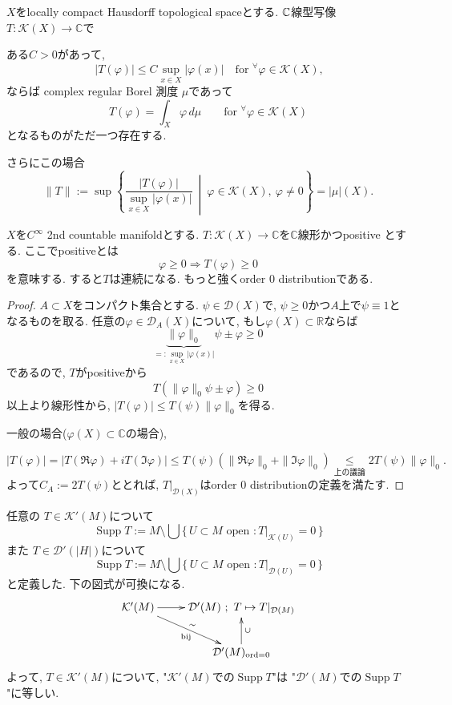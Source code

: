 \begin{tcolorbox}[mybox]
\begin{thm}\cite[Theorem 6.19]{Rud2}
\label{thm-M-4.2.13}
$X$をlocally compact Hausdorff topological spaceとする. 
$\mathbb{C}$線型写像$T:\mathcal{K}(X)\to \mathbb{C}$で

ある$ C>0$があって, 
$$\ |T(\varphi)|\leq C \sup_{x\in X}|\varphi(x)| \quad \text{for } {}^\forall \varphi\in \mathcal{K}(X),
$$
ならば
complex regular Borel 測度 $\mu$であって
\[
T(\varphi)=\int_X \varphi \, d\mu \qquad \text{for } {}^\forall \varphi\in \mathcal{K}(X)
\]
となるものがただ一つ存在する. 

さらにこの場合
\[
\|T\|:=\sup\left\{\frac{|T(\varphi)|}{\sup_{x\in X}|\varphi(x)|}\ \middle|\ \varphi\in \mathcal{K}(X),\ \varphi\neq 0\right\}
=|\mu|(X).
\]

\end{thm}
\end{tcolorbox}

\begin{rem}
$X$を$C^{\infty}$ 2nd countable manifoldとする. 
$T:\mathcal{K}(X)\to \mathbb{C}$を$\mathbb{C}$線形かつpositive とする.
ここでpositiveとは
\[
\varphi\geq 0 \Rightarrow T(\varphi)\geq 0
\]
を意味する. すると$T$は連続になる. もっと強くorder $0$ distributionである. 
\begin{proof}
$A\subset X$をコンパクト集合とする. 
 $\psi\in \mathcal{D}(X)$で, $\psi\geq 0$かつ$A$上で$\psi \equiv 1$となるものを取る. 
任意の$\varphi\in \mathcal{D}_A(X)$について, 
もし$\varphi(X)\subset \mathbb{R}$ならば
\[
\underbrace{\|\varphi\|_0}_{=:\sup_{x\in X} |\varphi(x)|}\psi \pm \varphi \geq 0
\]
であるので, $T$がpositiveから
\[
T(\|\varphi\|_0\psi \pm \varphi)\geq 0
\]
以上より線形性から, 
\( |T(\varphi)|\leq T(\psi)\|\varphi\|_0
\)を得る.

一般の場合($\varphi(X)\subset \mathbb{C}$の場合), 

\[
|T(\varphi)|=\left|T(\Re\varphi)+iT(\Im\varphi)\right|
\leq T(\psi)(\|\Re\varphi\|_0+\|\Im\varphi\|_0)
\underset{\text{上の議論}}{\leq} 2T(\psi)\|\varphi\|_0.
\]
よって$C_A:=2T(\psi)$ととれば, $T|_{\mathcal{D}(X)}$はorder $0$ distributionの定義を満たす. 
\end{proof}
\end{rem}



任意の \(T \in \mathcal{K}'(M)\)について
\[
\operatorname{Supp} T := M \setminus \bigcup \{\, U \subset M \text{ open }  : T|_{\mathcal{K}(U)} = 0 \,\}\]
また \(T \in \mathcal{D}'(|H|)\)について
\[\operatorname{Supp} T := M \setminus \bigcup \{\, U \subset M \text{ open } : T|_{\mathcal{D}(U)} = 0 \,\}\]
と定義した. 下の図式が可換になる.
\[
\xymatrix{
\mathcal{K}'(M) \ar[r] & \mathcal{D}'(M)\ ;\ T \mapsto T|_{\mathcal{D}(M)} \\
& \mathcal{D}'(M)_{\mathrm{ord}=0} \ar[u]_{\cup} \ar@{<-}[ul]_-{\sim}^{\mathrm{bij}}
}
\]
よって, 
\(T \in \mathcal{K}'(M)\)について, "$\mathcal{K}'(M)$での$\operatorname{Supp} T$"は
"$\mathcal{D}'(M)$での$\operatorname{Supp} T$"に等しい.


